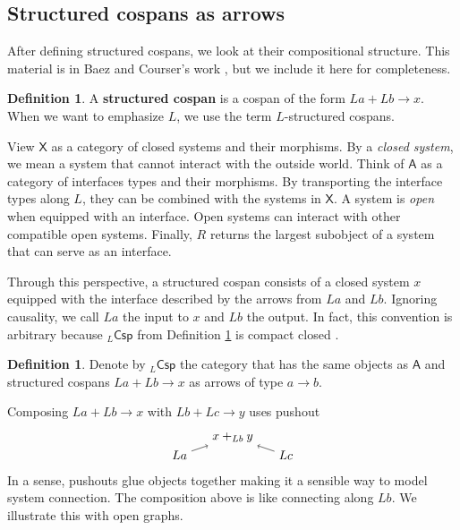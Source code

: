 \documentclass{amsart}
\newcommand{\A}{\cat{A}}
\newcommand{\X}{\cat{X}}
\newcommand{\Csp}{\cat{Csp}}
\newcommand{\defn}[1]{\textbf{#1}}
\newcommand{\cat}[1]{\mathsf{#1}}
\newcommand{\csp}[3]{#1 + #3 \to #2}
\theoremstyle{remark}
\theoremstyle{definition}
\newtheorem{definition}[theorem]{Definition}
\begin{document}

\subsection{Structured cospans as arrows}
\label{sec:StrCsp-as-Arrows}

After defining structured cospans, we look at their
compositional structure. This material is in Baez
and Courser's work \cite{StrCsp}, but we include it here for
completeness.

\begin{definition}\label{df:strcsp}
  A \defn{structured cospan} is a cospan of the form
  $ \csp{La}{x}{Lb} $.  When we want to emphasize $ L $, we
  use the term $ L $-structured cospans.
\end{definition}

View $ \X $ as a category of closed systems and their
morphisms. By a \emph{closed system}, we mean a system that
cannot interact with the outside world. Think of $ \A $ as a
category of interfaces types and their morphisms. By
transporting the interface types along $ L $, they can be
combined with the systems in $ \X $.  A system is
\emph{open} when equipped with an interface.  Open systems
can interact with other compatible open systems.  Finally,
$ R $ returns the largest subobject of a system that can
serve as an interface.

Through this perspective, a structured cospan consists of a
closed system $ x $ equipped with the interface described by
the arrows from $ La $ and $ Lb $. Ignoring causality, we call $ La $ the input to $ x $ and
$ Lb $ the output. In fact, this convention is arbitrary because $ _{L}\Csp $ from
Definition \ref{def:strcsp-arr} is compact closed
\cite{CicCour_SpCspTopos}.

\begin{definition}
\label{def:strcsp-arr}  
Denote by $ _{L}\Csp $ the category that has the same
objects as $ \A $ and structured cospans $ \csp{La}{x}{Lb} $
as arrows of type $ a \to b $.
\end{definition}

Composing $ \csp{La}{x}{Lb} $ with $ \csp{Lb}{y}{Lc} $ uses
pushout
%
\[
  \begin{tikzpicture}
    \begin{scope}[]
    \node (1) at (0,0) {\( La \)};
    \node (2) at (1.5,0.5) {\( x +_{Lb} y \)};
    \node (3) at (3,0) {\( Lc \)};
     \draw [->] (1) to node [] {\scriptsize{\(  \)}} (2);
    \draw [->] (3) to node [] {\scriptsize{\(  \)}} (2); 
    \end{scope}
  \end{tikzpicture}
\]
% 
In a sense, pushouts glue objects together making it a
sensible way to model system connection.  The composition
above is like connecting along $ Lb $. We illustrate this
with open graphs. 
\end{document}
